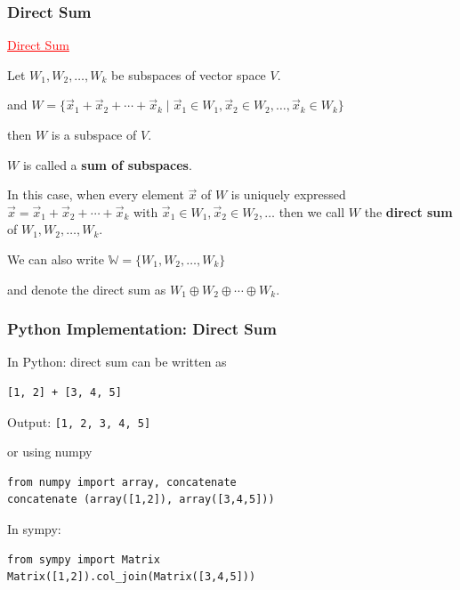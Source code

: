 \documentclass[aspectratio=169,xcolor=dvipsnames,svgnames,x11names,fleqn]{beamer}
\begin{document}
\begin{frame}
\frametitle{Direct Sum}

\textcolor{red}{\underline{Direct Sum}}

Let $W_1, W_2, \ldots, W_k$ be subspaces of vector space $V$.

and $W = \{\vec{x}_1 + \vec{x}_2 + \cdots + \vec{x}_k \mid \vec{x}_1 \in W_1, \vec{x}_2 \in W_2, \ldots, \vec{x}_k \in W_k\}$

then $W$ is a subspace of $V$.

$W$ is called a \textbf{sum of subspaces}.

\vspace{0.5cm}

In this case, when every element $\vec{x}$ of $W$ is uniquely expressed $\vec{x} = \vec{x}_1 + \vec{x}_2 + \cdots + \vec{x}_k$ with $\vec{x}_1 \in W_1, \vec{x}_2 \in W_2, \ldots$ then we call $W$ the \textbf{direct sum} of $W_1, W_2, \ldots, W_k$.

\vspace{0.3cm}

We can also write $\mathbb{W} = \{W_1, W_2, \ldots, W_k\}$

and denote the direct sum as $W_1 \oplus W_2 \oplus \cdots \oplus W_k$.

\end{frame}

\begin{frame}[containsverbatim]
\frametitle{Python Implementation: Direct Sum}

\textcolor{androidRed}{In Python: direct sum can be written as}

\begin{verbatim}
[1, 2] + [3, 4, 5]
\end{verbatim}

Output: \texttt{[1, 2, 3, 4, 5]}

\vspace{0.3cm}

\textcolor{androidRed}{or using numpy}

\begin{verbatim}
from numpy import array, concatenate
concatenate (array([1,2]), array([3,4,5]))
\end{verbatim}

\vspace{0.3cm}

\textcolor{androidRed}{In sympy:}

\begin{verbatim}
from sympy import Matrix
Matrix([1,2]).col_join(Matrix([3,4,5]))
\end{verbatim}

\end{frame}
\end{document}
